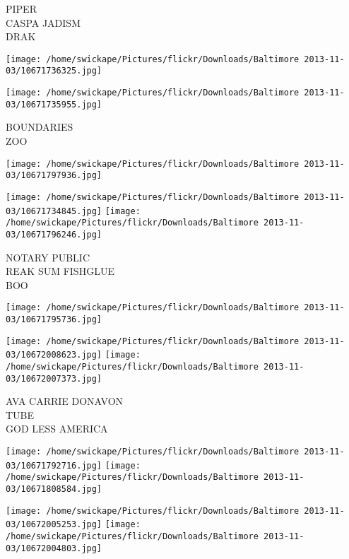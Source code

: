 \documentclass[10pt,letterpaper]{article}
\begin{document}
PIPER\\
CASPA JADISM\\
DRAK\\
\pagebreak

\texttt{[image: /home/swickape/Pictures/flickr/Downloads/Baltimore 2013-11-03/10671736325.jpg]}

\vspace{0.25in}
\texttt{[image: /home/swickape/Pictures/flickr/Downloads/Baltimore 2013-11-03/10671735955.jpg]}

BOUNDARIES\\
ZOO\\
\pagebreak

\texttt{[image: /home/swickape/Pictures/flickr/Downloads/Baltimore 2013-11-03/10671797936.jpg]}

\vspace{0.25in}
\texttt{[image: /home/swickape/Pictures/flickr/Downloads/Baltimore 2013-11-03/10671734845.jpg]}
\texttt{[image: /home/swickape/Pictures/flickr/Downloads/Baltimore 2013-11-03/10671796246.jpg]}

NOTARY PUBLIC\\
REAK SUM FISHGLUE\\
BOO\\
\pagebreak

\texttt{[image: /home/swickape/Pictures/flickr/Downloads/Baltimore 2013-11-03/10671795736.jpg]}

\vspace{0.25in}
\texttt{[image: /home/swickape/Pictures/flickr/Downloads/Baltimore 2013-11-03/10672008623.jpg]}
\texttt{[image: /home/swickape/Pictures/flickr/Downloads/Baltimore 2013-11-03/10672007373.jpg]}

AVA CARRIE DONAVON\\
TUBE\\
GOD LESS AMERICA\\
\pagebreak

\texttt{[image: /home/swickape/Pictures/flickr/Downloads/Baltimore 2013-11-03/10671792716.jpg]}
\texttt{[image: /home/swickape/Pictures/flickr/Downloads/Baltimore 2013-11-03/10671808584.jpg]}

\texttt{[image: /home/swickape/Pictures/flickr/Downloads/Baltimore 2013-11-03/10672005253.jpg]}
\texttt{[image: /home/swickape/Pictures/flickr/Downloads/Baltimore 2013-11-03/10672004803.jpg]}
\end{document}
